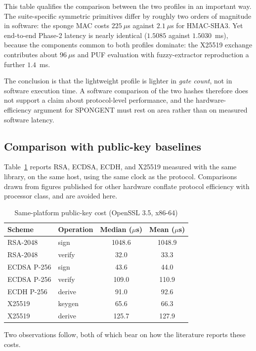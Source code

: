 \documentclass[11pt,a4paper]{article}
\begin{document}
This table qualifies the comparison between the two profiles in an important way.
The suite-specific symmetric primitives differ by roughly two orders of magnitude
in software: the sponge MAC costs $225~\mu$s against $2.1~\mu$s for HMAC-SHA3.
Yet end-to-end Phase-2 latency is nearly identical ($1.5085$ against
$1.5030$~ms), because the components common to both profiles dominate: the X25519
exchange contributes about $96~\mu$s and PUF evaluation with fuzzy-extractor
reproduction a further $1.4$~ms.

The conclusion is that the lightweight profile is lighter in \emph{gate count},
not in software execution time. A software comparison of the two hashes therefore
does not support a claim about protocol-level performance, and the
hardware-efficiency argument for SPONGENT must rest on area rather than on
measured software latency.

\subsection{Comparison with public-key baselines}
\label{subsec:baselines}

Table~\ref{tab:pki} reports RSA, ECDSA, ECDH, and X25519 measured with the same
library, on the same host, using the same clock as the protocol. Comparisons drawn
from figures published for other hardware conflate protocol efficiency with
processor class, and are avoided here.

\begin{table}[H]
\centering
\caption{Same-platform public-key cost (OpenSSL 3.5, x86-64)}
\label{tab:pki}
\small
\begin{tabular}{@{}llcc@{}}
\toprule
\textbf{Scheme} & \textbf{Operation} & \textbf{Median ($\mu$s)} & \textbf{Mean ($\mu$s)} \\
\midrule
RSA-2048 & sign & 1048.6 & 1048.9 \\
RSA-2048 & verify & 32.0 & 33.3 \\
ECDSA P-256 & sign & 43.6 & 44.0 \\
ECDSA P-256 & verify & 109.0 & 110.9 \\
ECDH P-256 & derive & 91.0 & 92.6 \\
X25519 & keygen & 65.6 & 66.3 \\
X25519 & derive & 125.7 & 127.9 \\
\bottomrule
\end{tabular}
\end{table}

Two observations follow, both of which bear on how the literature reports these
costs.
\end{document}
